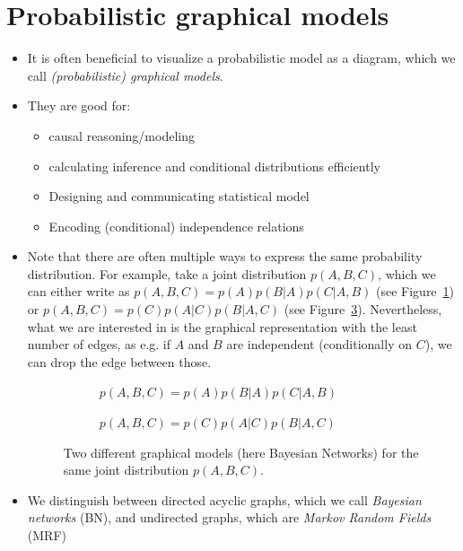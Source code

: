 \section{Probabilistic graphical models}
\begin{itemize}
	\item It is often beneficial to visualize a probabilistic model as a diagram, which we call \textit{(probabilistic) graphical models}. 
	\item They are good for:
	\begin{itemize}
		\item causal reasoning/modeling
		\item calculating inference and conditional distributions efficiently 
		\item Designing and communicating statistical model
		\item Encoding (conditional) independence relations
	\end{itemize} 
	\item Note that there are often multiple ways to express the same probability distribution. For example, take a joint distribution $p(A,B,C)$, which we can either write as $p(A,B,C)=p(A)p(B|A)p(C|A,B)$ (see Figure~\ref{fig:graphical_models_example_1}) or $p(A,B,C)=p(C)p(A|C)p(B|A,C)$ (see Figure~\ref{fig:graphical_models_example_2}). Nevertheless, what we are interested in is the graphical representation with the least number of edges, as e.g. if $A$ and $B$ are independent (conditionally on $C$), we can drop the edge between those.
	\begin{figure}[ht!]
		\centering
		\begin{subfigure}{0.4\textwidth}
			\centering
			\caption{$p(A,B,C)=p(A)p(B|A)p(C|A,B)$}
			\label{fig:graphical_models_example_1}
		\end{subfigure}
		\hspace{10mm}
		\begin{subfigure}{0.4\textwidth}
			\centering
			\caption{$p(A,B,C)=p(C)p(A|C)p(B|A,C)$}
			\label{fig:graphical_models_example_2}
		\end{subfigure}
		\caption{Two different graphical models (here Bayesian Networks) for the same joint distribution $p(A,B,C)$.}
	\end{figure}
	\item We distinguish between directed acyclic graphs, which we call \textit{Bayesian networks} (BN), and undirected graphs, which are \textit{Markov Random Fields} (MRF)
\end{itemize}


